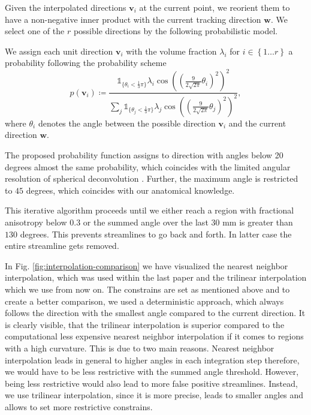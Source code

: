 Given the interpolated directions $\mathbf{v}_i$ at the current point, we
reorient them to have a non-negative inner product with the current tracking
direction $\mathbf{w}$. We select one of the $r$ possible directions by the
following probabilistic model.

We assign each unit direction $\mathbf{v}_i$ with the volume fraction
$\lambda_i$ for $i \in \left\{ 1\dots r \right\}$ a probability following the probability
scheme 
\[
	p \left( \mathbf{v}_i \right) \coloneqq \frac{ \mathbb{1}_{\lbrace\theta_i <
		\frac{1}{3} \pi \rbrace} \lambda_i \cos \left( \left( \frac{9}{2\sqrt{2
\pi}} \theta_i \right)^2 \right)^2}{\sum_j \mathbb{1}_{\lbrace\theta_j <
		\frac{1}{3} \pi \rbrace} \lambda_j \cos \left( \left( \frac{9}{2\sqrt{2
\pi}} \theta_j \right)^2 \right)^2 }, 
\]
where $\theta_i$ denotes the angle between the possible direction $\mathbf{v}_i$
and the current direction $\mathbf{w}$. 

The proposed probability function assigns to direction with angles below 20 degrees almost the
same probability, which coincides with the limited angular resolution of
spherical deconvolution \cite{TOURNIER20071459}. Further, the maximum angle is
restricted to $45$ degrees, which coincides with our anatomical knowledge.

This iterative algorithm proceeds until we either reach a region with fractional
anisotropy below $0.3$ or the summed angle over the last $30$ mm is greater than
$130$ degrees. This prevents streamlines to go back and forth. In latter case
the entire streamline gets removed. 

In Fig. \ref{fig:interpolation-comparison} we have visualized the nearest
neighbor interpolation, which was used within the last paper and the trilinear
interpolation which we use from now on. The constrains are set as mentioned
above and to create a better comparison, we used a deterministic approach, which
always follows the direction with the smallest angle compared to the current
direction. It is clearly visible, that the trilinear interpolation is superior
compared to the computational less expensive nearest neighbor interpolation if it comes to
regions with a high curvature. This is due to two main reasons. Nearest neighbor
interpolation leads in general to higher angles in each integration step
therefore, we would have to be less restrictive with the summed angle threshold.
However, being less restrictive would also lead to more false positive
streamlines. Instead, we use trilinear interpolation, since it is more precise,
leads to smaller angles and allows to set more restrictive constrains. 

